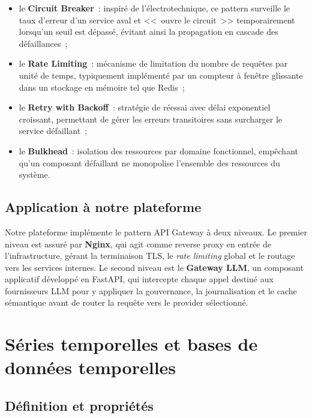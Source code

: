 \begin{itemize}[noitemsep]
    \item le \textbf{Circuit Breaker}~: inspiré de l'électrotechnique, ce pattern surveille le taux d'erreur d'un service aval et <<~ouvre le circuit~>> temporairement lorsqu'un seuil est dépassé, évitant ainsi la propagation en cascade des défaillances~;
    \item le \textbf{Rate Limiting}~: mécanisme de limitation du nombre de requêtes par unité de temps, typiquement implémenté par un compteur à fenêtre glissante dans un stockage en mémoire tel que Redis~;
    \item le \textbf{Retry with Backoff}~: stratégie de réessai avec délai exponentiel croissant, permettant de gérer les erreurs transitoires sans surcharger le service défaillant~;
    \item le \textbf{Bulkhead}~: isolation des ressources par domaine fonctionnel, empêchant qu'un composant défaillant ne monopolise l'ensemble des ressources du système.
\end{itemize}

\subsection{Application à notre plateforme}

Notre plateforme implémente le pattern API Gateway à deux niveaux. Le premier niveau est assuré par \textbf{Nginx}, qui agit comme reverse proxy en entrée de l'infrastructure, gérant la terminaison TLS, le \textit{rate limiting} global et le routage vers les services internes. Le second niveau est le \textbf{Gateway LLM}, un composant applicatif développé en FastAPI, qui intercepte chaque appel destiné aux fournisseurs LLM pour y appliquer la gouvernance, la journalisation et le cache sémantique avant de router la requête vers le provider sélectionné.


\section{Séries temporelles et bases de données temporelles}
\label{sec:timeseries}

\subsection{Définition et propriétés}

